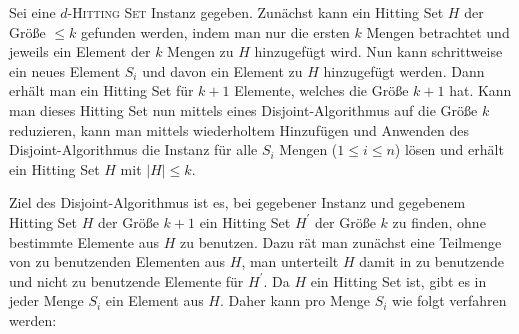 

\DeclareMathOperator{\vc}{vc}




Sei eine $d$-\textsc{Hitting Set} Instanz gegeben. Zunächst kann ein Hitting Set $H$ der Größe $\leq k$ gefunden werden, indem man nur die ersten $k$ Mengen betrachtet und jeweils ein Element der $k$ Mengen zu $H$ hinzugefügt wird. Nun kann schrittweise ein neues Element $S_i$ und davon ein Element zu $H$ hinzugefügt werden. Dann erhält man ein Hitting Set für $k+1$ Elemente, welches die Größe $k+1$ hat. Kann man dieses Hitting Set nun mittels eines Disjoint-Algorithmus auf die Größe $k$ reduzieren, kann man mittels wiederholtem Hinzufügen und Anwenden des Disjoint-Algorithmus die Instanz für alle $S_i$ Mengen ($1 \leq i \leq n$) lösen und erhält ein Hitting Set $H$ mit $|H| \leq k$.

Ziel des Disjoint-Algorithmus ist es, bei gegebener Instanz und gegebenem Hitting Set $H$ der Größe $k+1$ ein Hitting Set $H^\prime$ der Größe $k$ zu finden, ohne bestimmte Elemente aus $H$ zu benutzen. Dazu rät man zunächst eine Teilmenge von zu benutzenden Elementen aus $H$, man unterteilt $H$ damit in zu benutzende und nicht zu benutzende Elemente für $H^\prime$. Da $H$ ein Hitting Set ist, gibt es in jeder Menge $S_i$ ein Element aus $H$. Daher kann pro Menge $S_i$ wie folgt verfahren werden:

